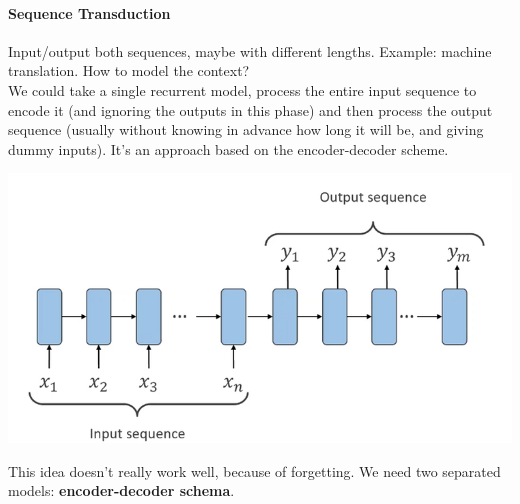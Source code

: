 \documentclass[10pt]{report}
\begin{document}
\paragraph{Sequence Transduction} Input/output both sequences, maybe with different lengths. Example: machine translation. How to model the context?\\
We could take a single recurrent model, process the entire input sequence to encode it (and ignoring the outputs in this phase) and then process the output sequence (usually without knowing in advance how long it will be, and giving dummy inputs). It's an approach based on the encoder-decoder scheme.
\begin{center}
	\includegraphics[scale=0.5]{107.png}
\end{center}
This idea doesn't really work well, because of forgetting. We need two separated models: \textbf{encoder-decoder schema}.
\end{document}
